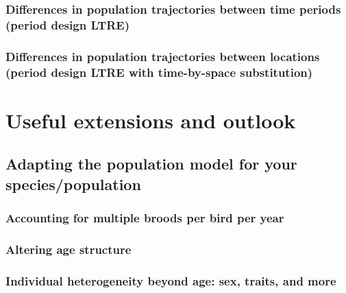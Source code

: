 \documentclass[
]{book}
\begin{document}
\hypertarget{differences-in-population-trajectories-between-time-periods-period-design-ltre}{%
\subsection{Differences in population trajectories between time periods (period design LTRE)}\label{differences-in-population-trajectories-between-time-periods-period-design-ltre}}

\hypertarget{differences-in-population-trajectories-between-locations-period-design-ltre-with-time-by-space-substitution}{%
\subsection{Differences in population trajectories between locations (period design LTRE with time-by-space substitution)}\label{differences-in-population-trajectories-between-locations-period-design-ltre-with-time-by-space-substitution}}

\hypertarget{ExtOutlook}{%
\chapter{Useful extensions and outlook}\label{ExtOutlook}}

\hypertarget{adapting-the-population-model-for-your-speciespopulation}{%
\section{Adapting the population model for your species/population}\label{adapting-the-population-model-for-your-speciespopulation}}

\hypertarget{accounting-for-multiple-broods-per-bird-per-year}{%
\subsection{Accounting for multiple broods per bird per year}\label{accounting-for-multiple-broods-per-bird-per-year}}

\hypertarget{altering-age-structure}{%
\subsection{Altering age structure}\label{altering-age-structure}}

\hypertarget{individual-heterogeneity-beyond-age-sex-traits-and-more}{%
\subsection{Individual heterogeneity beyond age: sex, traits, and more}\label{individual-heterogeneity-beyond-age-sex-traits-and-more}}
\end{document}
